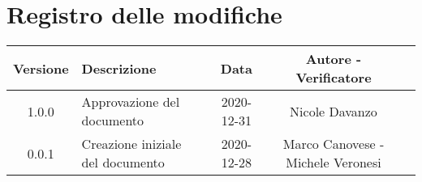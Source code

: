 \section*{Registro delle modifiche}

\begin{center}
	\begin{longtable}{|c|p{5cm}|c|c|c|}
	\hline
	\rowcolor{lighter-grayer}
	\textbf{Versione} & \textbf{Descrizione} & \textbf{Data} & \textbf{Autore - Verificatore}\\
	\hline
	\endfirsthead


	\hline
	1.0.0 & Approvazione del documento & 2020-12-31 & Nicole Davanzo\\
	0.0.1 & Creazione iniziale del documento & 2020-12-28 & Marco Canovese - Michele Veronesi \\

	\hline

	\end{longtable}
\end{center}
